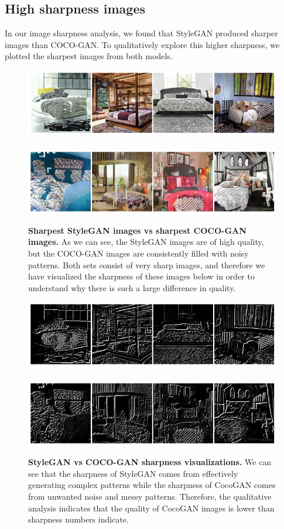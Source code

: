 \documentclass{article}
\begin{document}
        \subsection{High sharpness images}
        In our image sharpness analysis, we found that StyleGAN produced sharper images than COCO-GAN.
        To qualitatively explore this higher sharpness, we plotted the sharpest images from both models.
        \begin{figure}[H]
          \centering
          \includegraphics[scale=0.25]{sharpness-images/stylegan_sharpness.png} 
          \ \ 
          \includegraphics[scale=0.25]{sharpness-images/coco_sharpness.png}
          \caption{\textbf{Sharpest StyleGAN images vs sharpest COCO-GAN images.} As we can see, the StyleGAN images are of high quality, but the COCO-GAN images are consistently filled with noisy patterns.
            Both sets consist of very sharp images, and therefore we have visualized the sharpness of these images below in order to understand why there is such a large difference in quality.\\}
        \includegraphics[scale=0.25]{sharpness-images/stylegan_sharpness_lines.png}
          \ \
          \includegraphics[scale=0.25]{sharpness-images/coco_sharpness_lines.png}
          \caption{\textbf{StyleGAN vs COCO-GAN sharpness visualizations.} We can see that the sharpness of StyleGAN comes from effectively generating complex patterns while the sharpness of CocoGAN comes from unwanted noise and messy patterns. Therefore, the qualitative analysis indicates that the quality of CocoGAN images is lower than sharpness numbers indicate.}
        \end{figure} 
\end{document}
